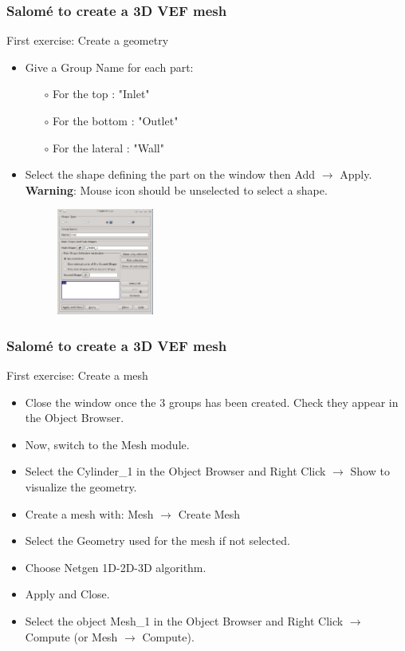 \documentclass[10pt]{beamer}
\begin{document}
\begin{frame}
\frametitle{Salom\'e to create a 3D VEF mesh}
\begin{block}{First exercise: Create a geometry}

\begin{itemize}
\item Give a Group Name for each part:
    \begin{itemize}
    \item [$\circ$] For the top : "Inlet"
    \item [$\circ$] For the bottom : "Outlet"
    \item [$\circ$] For the lateral : "Wall"
    \end{itemize}

\item Select the shape defining the part on the window then Add $\rightarrow$ Apply.\\
\textbf{Warning}: Mouse icon should be unselected to select a shape.
\begin{figure}
\includegraphics[width=0.3\textwidth]{PICTURES/salome3.jpg}
\end{figure}
\end{itemize}

\end{block}
\end{frame}
\begin{frame}
\frametitle{Salom\'e to create a 3D VEF mesh}
\begin{block}{First exercise: Create a mesh}

\begin{itemize}
\item Close the window once the 3 groups has been created. Check they appear in the Object Browser.

\item Now, switch to the Mesh module.
\item Select the Cylinder\_1 in the Object Browser and Right Click $\rightarrow$ Show to visualize the geometry.
\item Create a mesh with: Mesh $\rightarrow$ Create Mesh
\item Select the Geometry used for the mesh if not selected.
\item Choose Netgen 1D-2D-3D algorithm.
\item Apply and Close.
\item Select the object Mesh\_1 in the Object Browser and Right Click $\rightarrow$ Compute (or Mesh $\rightarrow$ Compute).
\end{itemize}

\end{block}
\end{frame}
\end{document}
